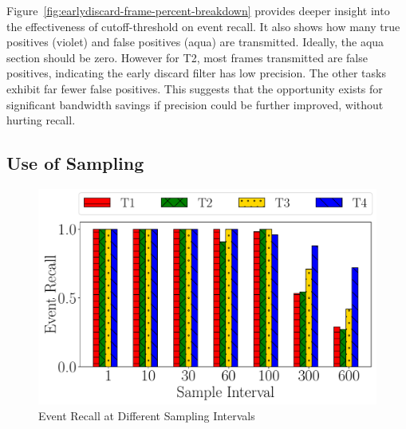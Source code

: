 Figure~\ref{fig:earlydiscard-frame-percent-breakdown} provides deeper insight
into the effectiveness of cutoff-threshold on event recall. It also shows how
many true positives (violet) and false positives (aqua) are
transmitted. Ideally, the aqua section should be zero.  However for T2, most
frames transmitted are false positives, indicating the early discard filter has
low precision.  The other tasks exhibit far fewer false positives.  This
suggests that the opportunity exists for significant bandwidth savings if
precision could be further improved, without hurting recall.

\subsection{Use of Sampling}

\begin{figure}[h]
    \centering
    \includegraphics[width=.9\linewidth]{FIGS/fig-random-select-interval-recall-hatch.pdf}
\caption{Event Recall at Different Sampling Intervals}
\label{fig:sampling-only}
\end{figure}


